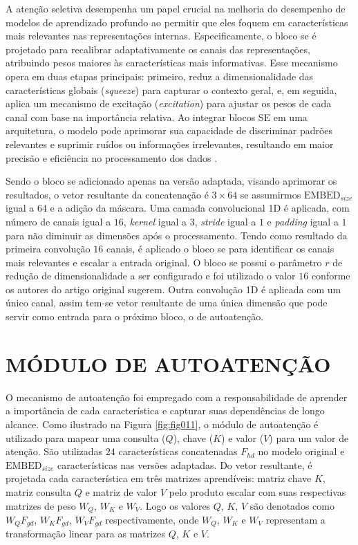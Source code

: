 A atenção seletiva desempenha um papel crucial na melhoria do desempenho de modelos de aprendizado profundo ao permitir que eles foquem em características mais relevantes nas representações internas. Especificamente, o bloco \gls{se} é projetado para recalibrar adaptativamente os canais das representações, atribuindo pesos maiores às características mais informativas. Esse mecanismo opera em duas etapas principais: primeiro, reduz a dimensionalidade das características globais (\textit{squeeze}) para capturar o contexto geral, e, em seguida, aplica um mecanismo de excitação (\textit{excitation}) para ajustar os pesos de cada canal com base na importância relativa. Ao integrar blocos SE em uma arquitetura, o modelo pode aprimorar sua capacidade de discriminar padrões relevantes e suprimir ruídos ou informações irrelevantes, resultando em maior precisão e eficiência no processamento dos dados \cite{huSqueezeandExcitationNetworks2018}.

Sendo o bloco \gls{se} adicionado apenas na versão adaptada, visando aprimorar os resultados, o vetor resultante da concatenação é $3\times64$ se assumirmos $\text{EMBED}_{size}$ igual a $64$ e a adição da máscara. Uma camada convolucional 1D é aplicada, com número de canais igual a $16$, \textit{kernel} igual a 3, \textit{stride} igual a $1$ e \textit{padding} igual a $1$ para não diminuir as dimensões após o processamento. Tendo como resultado da primeira convolução $16$ canais, é aplicado o bloco \gls{se} para identificar os canais mais relevantes e escalar a entrada original. O bloco \gls{se} possui o parâmetro $r$ de redução de dimensionalidade a ser configurado e foi utilizado o valor $16$ conforme os autores do artigo original sugerem. Outra convolução 1D é aplicada com um único canal, assim tem-se vetor resultante de uma única dimensão que pode servir como entrada para o próximo bloco, o de autoatenção.

\section{MÓDULO DE AUTOATENÇÃO}
\label{subsec:cap4_mod_self_attnn}

O mecanismo de autoatenção foi empregado com a responsabilidade de aprender a importância de cada característica e capturar suas dependências de longo alcance. Como ilustrado na Figura \ref{fig:fig011}, o módulo de autoatenção é utilizado para mapear uma consulta ($Q$), chave ($K$) e valor ($V$) para um valor de atenção. São utilizadas $24$ características concatenadas $F_{hd}$ no modelo original e $\text{EMBED}_{size}$ características nas versões adaptadas. Do vetor resultante, é projetada cada característica em três matrizes aprendíveis: matriz chave $K$, matriz consulta $Q$ e matriz de valor $V$ pelo produto escalar com suas respectivas matrizes de peso $W_{Q}$, $W_{K}$ e $W_{V}$. Logo os valores $Q$, $K$, $V$ são denotados como $W_{Q}F_{gd}$, $W_{K}F_{gd}$, $W_{V}F_{gd}$ respectivamente, onde $W_{Q}$, $W_{K}$ e $W_{V}$ representam a transformação linear para as matrizes $Q$, $K$ e $V$. 

